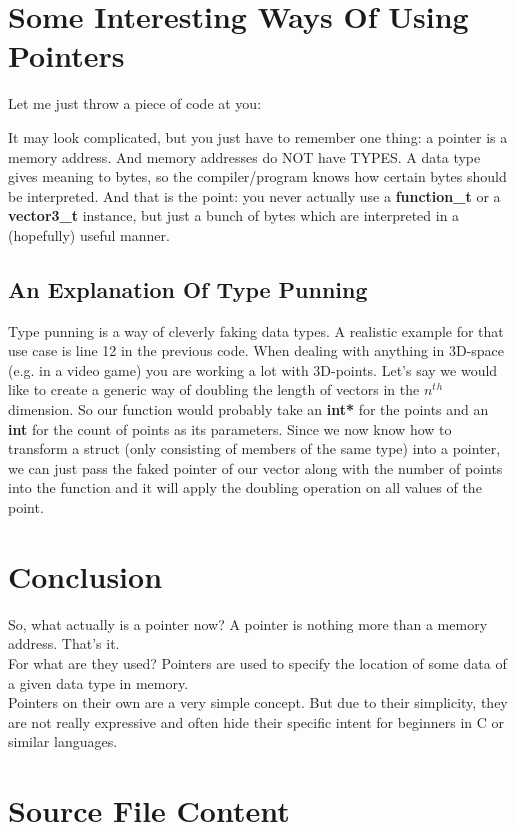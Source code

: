 \documentclass{article}
\begin{document}
  \newpage
  \section{Some Interesting Ways Of Using Pointers}
  Let me just throw a piece of code at you:
  
  It may look complicated, but you just have to remember one thing: a pointer is a memory address.
  And memory addresses do NOT have TYPES.
  A data type gives meaning to bytes, so the compiler/program knows how certain bytes should be interpreted.
  And that is the point: you never actually use a \textbf{function\_t} or a \textbf{vector3\_t} instance, but just a bunch of bytes which are interpreted in a (hopefully) useful manner.
  \subsection{An Explanation Of Type Punning}
  Type punning is a way of cleverly faking data types.
  A realistic example for that use case is line 12 in the previous code.
  When dealing with anything in 3D-space (e.g. in a video game) you are working a lot with 3D-points.
  Let's say we would like to create a generic way of doubling the length of vectors in the $n^t$$^h$ dimension.
  So our function would probably take an \textbf{int*} for the points and an \textbf{int} for the count of points as its parameters.
  Since we now know how to transform a struct (only consisting of members of the same type) into a pointer, we can just pass the faked pointer of our vector along with the number of points into the function and it will apply the doubling operation on all values of the point.
  \newpage
  \section{Conclusion}
  So, what actually is a pointer now?
  A pointer is nothing more than a memory address.
  That's it.
  \\For what are they used?
  Pointers are used to specify the location of some data of a given data type in memory.
  \\Pointers on their own are a very simple concept.
  But due to their simplicity, they are not really expressive and often hide their specific intent for beginners in C or similar languages.
  
  \newpage
  \section{Source File Content}
  
  
\end{document}
